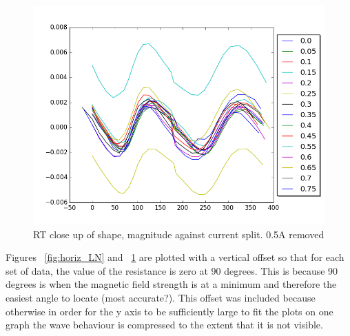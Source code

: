 \documentclass[10pt, twocolumn]{revtex4}
\begin{document}
\begin{figure}[H]
	\centering
	\includegraphics[width = \columnwidth]{RT_adj_fig.png}
	\caption{RT close up of shape, magnitude against current split. 0.5A removed}
	\label{fig:horiz_RT}
\end{figure}

Figures ~\ref{fig:horiz_LN} and ~\ref{fig:horiz_RT} are plotted with a vertical offset so that for each set of data, the value of the resistance is zero at 90 degrees. This is because 90 degrees is when the magnetic field strength is at a minimum and therefore the easiest angle to locate (most accurate?). This offset was included because otherwise in order for the y axis to be sufficiently large to fit the plots on one graph the wave behaviour is compressed to the extent that it is not visible.
\end{document}
